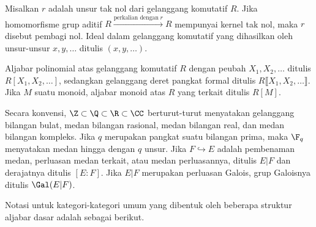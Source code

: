 Misalkan $r$ adalah unsur tak nol dari gelanggang komutatif $R$. Jika homomorfisme grup
aditif $R \xrightarrow{\text{perkalian dengan}\; r} R$ mempunyai kernel tak
nol, maka $r$ disebut pembagi nol. Ideal dalam gelanggang komutatif yang
dihasilkan oleh unsur-unsur $x, y, \ldots$ ditulis $(x, y, \ldots)$.

Aljabar polinomial atas gelanggang komutatif $R$ dengan peubah
$X_1, X_2, \ldots$ ditulis $R[X_1, X_2, \ldots]$, sedangkan gelanggang deret
pangkat formal ditulis $R\llbracket X_1, X_2, \ldots \rrbracket$. Jika $M$
suatu monoid, aljabar monoid atas $R$ yang terkait ditulis $R[M]$.

Secara konvensi, $\Z \subset \Q \subset \R \subset \CC$ berturut-turut
menyatakan gelanggang bilangan bulat, medan bilangan rasional, medan
bilangan real, dan medan bilangan kompleks. Jika $q$ merupakan pangkat suatu
bilangan prima, maka $\F_q$ menyatakan medan hingga dengan $q$ unsur. Jika
$F \hookrightarrow E$ adalah pembenaman medan, perluasan medan terkait,
atau medan perluasannya, ditulis $E|F$ dan derajatnya ditulis $[E:F]$.
Jika $E|F$ merupakan perluasan
Galois, grup Galoisnya ditulis $\Gal(E|F)$.


Notasi untuk kategori-kategori umum yang dibentuk oleh beberapa struktur
aljabar dasar adalah sebagai berikut.

